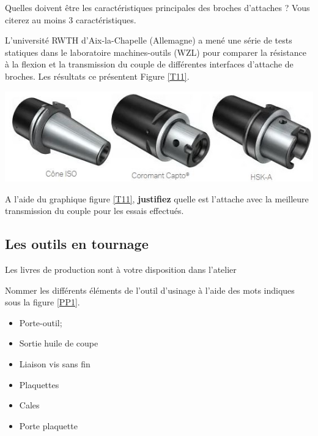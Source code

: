 \documentclass[12pt]{article}
\newcounter{exo}
\newenvironment{exo}{\stepcounter{exo}\vspace{0.5cm}{\bfseries Question \theexo\ :}}{\par\vspace{0.5cm}}
\begin{document}
\begin{exo} Quelles doivent être les caractéristiques principales des broches d'attaches ? Vous citerez au moins 3 caractéristiques.\end{exo}



L'université RWTH d'Aix-la-Chapelle (Allemagne) a mené une série de tests statiques dans le laboratoire machines-outils (WZL) pour comparer la résistance à la flexion et la transmission du couple de différentes interfaces d'attache de broches. Les résultats ce présentent Figure \ref{T11}.

\includegraphics[width=0.9\linewidth]{Images/cone1.JPG}


\begin{exo} A l’aide du graphique figure \ref{T11}, \textbf{justifiez} quelle est l’attache avec la meilleure transmission du couple pour les essais effectués. \end{exo}

\subsection{Les outils en tournage}


\begin{tcolorbox}[colback=blue!5!white,colframe=red!75!black]
  \bcinfo Les livres de production sont à votre disposition dans l'atelier
\end{tcolorbox}

\begin{exo} Nommer les différents  éléments de l’outil d’usinage à l'aide des mots
indiques sous la figure \ref{PP1}. \end{exo}

\begin{minipage}{.55\linewidth}
\begin{itemize}
    \item Porte-outil;
    \item Sortie huile de coupe
    \item Liaison vis sans fin
\end{itemize} 
\end{minipage}
\begin{minipage}{.44\linewidth}
\begin{itemize}
    \item Plaquettes
    \item Cales
    \item Porte plaquette
\end{itemize} 
\end{minipage}
\end{document}
